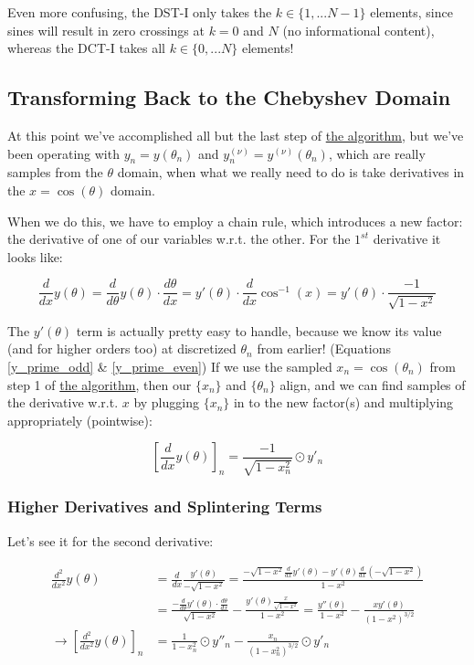 \documentclass[10pt]{article}
\begin{document}
Even more confusing, the DST-I only takes the $k \in \{1, ... N-1\}$ elements, since sines will result in zero crossings at $k = 0$ and $N$ (no informational content), whereas the DCT-I takes all $k \in \{0, ... N\}$ elements!

\subsection{Transforming Back to the Chebyshev Domain}

At this point we've accomplished all but the last step of \hyperref[algo]{the algorithm}, but we've been operating with $y_n = y(\theta_n)$ and $y_n^{(\nu)} = y^{(\nu)}(\theta_n)$, which are really samples from the $\theta$ domain, when what we really need to do is take derivatives in the $x = \cos(\theta)$ domain.

When we do this, we have to employ a chain rule, which introduces a new factor: the derivative of one of our variables w.r.t. the other. For the $1^{st}$ derivative it looks like:

$$\frac{d}{dx} y(\theta) = \frac{d}{d\theta} y(\theta) \cdot \frac{d\theta}{dx} = y'(\theta) \cdot \frac{d}{dx} \cos^{-1}(x) = y'(\theta) \cdot \frac{-1}{\sqrt{1 - x^2}}$$

The $y'(\theta)$ term is actually pretty easy to handle, because we know its value (and for higher orders too) at discretized $\theta_n$ from earlier! (Equations \ref{y_prime_odd} \& \ref{y_prime_even}) If we use the sampled $x_n = \cos(\theta_n)$ from step 1 of \hyperref[algo]{the algorithm}, then our $\{x_n\}$ and $\{\theta_n\}$ align, and we can find samples of the derivative w.r.t. $x$ by plugging $\{x_n\}$ in to the new factor(s) and multiplying appropriately (pointwise):

$$[\frac{d}{dx} y(\theta)]_n = \frac{-1}{\sqrt{1 - x_n^2}} \odot y'_n$$

\subsubsection{Higher Derivatives and Splintering Terms}

Let's see it for the second derivative:

\begin{align*}
\frac{d^2}{dx^2} y(\theta) &= \frac{d}{dx} \frac{y'(\theta)}{-\sqrt{1-x^2}} = \frac{-\sqrt{1-x^2} \frac{d}{dx} y'(\theta) - y'(\theta) \frac{d}{dx} (-\sqrt{1-x^2})}{1 - x^2} \\
&= \frac{-\frac{d}{d\theta}y'(\theta)\cdot \frac{d\theta}{dx}}{\sqrt{1-x^2}} - \frac{y'(\theta)\frac{x}{\sqrt{1-x^2}}}{1 - x^2} = \frac{y''(\theta)}{1-x^2} - \frac{x y'(\theta)}{(1 - x^2)^{3/2}} \\
\longrightarrow [\frac{d^2}{dx^2} y(\theta)]_n &= \frac{1}{1-x_n^2} \odot y''_n - \frac{x_n}{(1 - x_n^2)^{3/2}} \odot y'_n
\end{align*}
\end{document}
